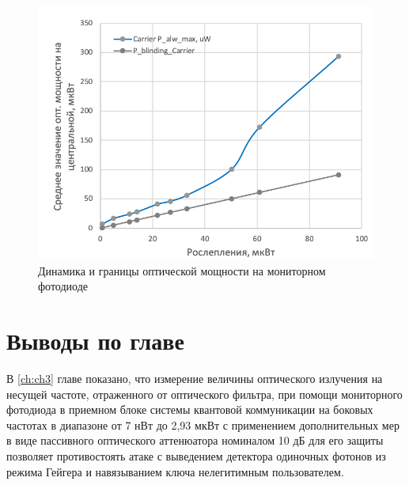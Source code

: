  \begin{figure}[ht]
  \centering
  \includegraphics{images/Watchdog_photodiode.png}
  \caption{Динамика и границы оптической мощности на мониторном фотодиоде}
  \label{fig:Watchdog_photodiode}
\end{figure}


\pagebreak
\section{Выводы по главе} \label{ch:ch3/sect7}


В \ref{ch:ch3} главе показано, что измерение величины оптического излучения на несущей частоте, отраженного от оптического фильтра, при помощи мониторного фотодиода в приемном блоке системы квантовой коммуникации на боковых частотах в диапазоне от 7 нВт до 2,93 мкВт с применением дополнительных мер в виде пассивного оптического аттенюатора номиналом 10 дБ для его защиты позволяет противостоять атаке с выведением детектора одиночных фотонов из режима Гейгера и навязыванием ключа нелегитимным пользователем. 
  
